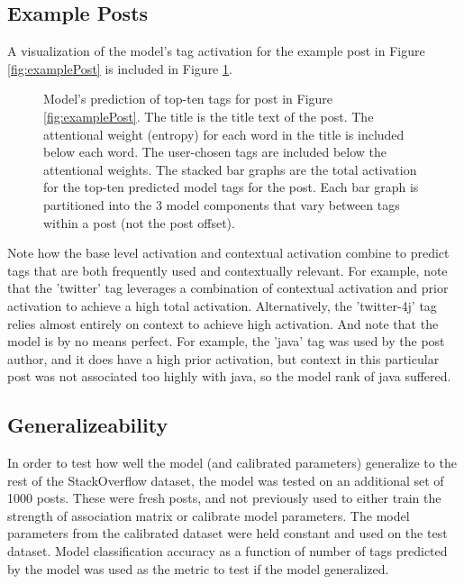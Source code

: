 \documentclass[10pt,letterpaper]{article}
\begin{document}
\subsection{Example Posts}

A visualization of the model's tag activation for the example post in Figure \ref{fig:examplePost} is included in Figure \ref{fig:modelPost}.

\begin{figure}[ht]
  \centering
  \caption{
    Model's prediction of top-ten tags for post in Figure \ref{fig:examplePost}.
    The title is the title text of the post.
    The attentional weight (entropy) for each word in the title is included below each word.
    The user-chosen tags are included below the attentional weights.
    The stacked bar graphs are the total activation for the top-ten predicted model tags for the post.
    Each bar graph is partitioned into the 3 model components that vary between tags within a post (not the post offset).
}
  \label{fig:modelPost}
\end{figure}

Note how the base level activation and contextual activation combine to predict tags that are both frequently used and contextually relevant.
For example, note that the 'twitter' tag leverages a combination of contextual activation and prior activation to achieve a high total activation.
Alternatively, the 'twitter-4j' tag relies almost entirely on context to achieve high activation.
And note that the model is by no means perfect.
For example, the 'java' tag was used by the post author, and it does have a high prior activation, but context in this particular post was not associated too highly with java, so the model rank of java suffered.

\subsection{Generalizeability}

In order to test how well the model (and calibrated parameters) generalize to the rest of the StackOverflow dataset, the model was tested on an additional set of \num{1000} posts.
These were fresh posts, and not previously used to either train the strength of association matrix or calibrate model parameters.
The model parameters from the calibrated dataset were held constant and used on the test dataset.
Model classification accuracy as a function of number of tags predicted by the model was used as the metric to test if the model generalized.
\end{document}
